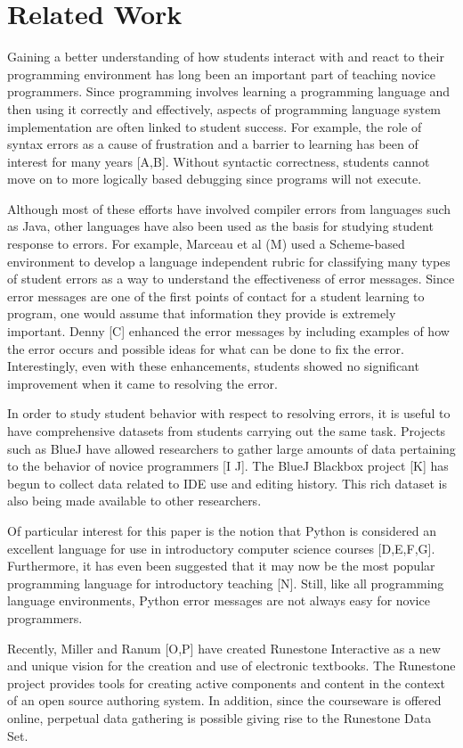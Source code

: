 \section*{Related Work}


Gaining a better understanding of how students interact with and react to their programming environment has long been an important part of teaching novice programmers.  Since programming involves learning a programming language and then using it correctly and effectively, aspects of programming language system implementation are often linked to student success.  For example, the role of syntax errors as a cause of frustration and a barrier to learning has been of interest for many years [A,B].  Without syntactic correctness, students cannot move on to more logically based debugging since programs will not execute.  

Although most of these efforts have involved compiler errors from languages such as Java, other languages have also been used as the basis for studying student response to errors.  For example, Marceau et al (M) used a Scheme-based environment to develop a language independent rubric for classifying many types of student errors as a way to understand the effectiveness of error messages.  Since error messages are one of the first points of contact for a student learning to program, one would assume that information they provide is extremely important.  Denny [C] enhanced the error messages by including examples of how the error occurs and possible ideas for what can be done to fix the error.  Interestingly, even with these enhancements, students showed no significant improvement when it came to resolving the error.

In order to study student behavior with respect to resolving errors, it is useful to have comprehensive datasets from students carrying out the same task.  Projects such as BlueJ have allowed researchers to gather large amounts of data pertaining to the behavior of novice programmers [I J].  The BlueJ Blackbox project [K] has begun to collect data related to IDE use and editing history.  This rich dataset is also being made available to other researchers.

Of particular interest for this paper is the notion that Python is considered an excellent language for use in introductory computer science courses [D,E,F,G].  Furthermore, it has even been suggested that it may now be the most popular programming language for introductory teaching [N]. Still, like all programming language environments, Python error messages are not always easy for novice programmers. 

Recently, Miller and Ranum [O,P] have created Runestone Interactive as a new and unique vision for the creation and use of electronic textbooks. The Runestone project provides tools for creating active components and content in the context of an open source authoring system.  In addition, since the courseware is offered online, perpetual data gathering is possible giving rise to the Runestone Data Set.


